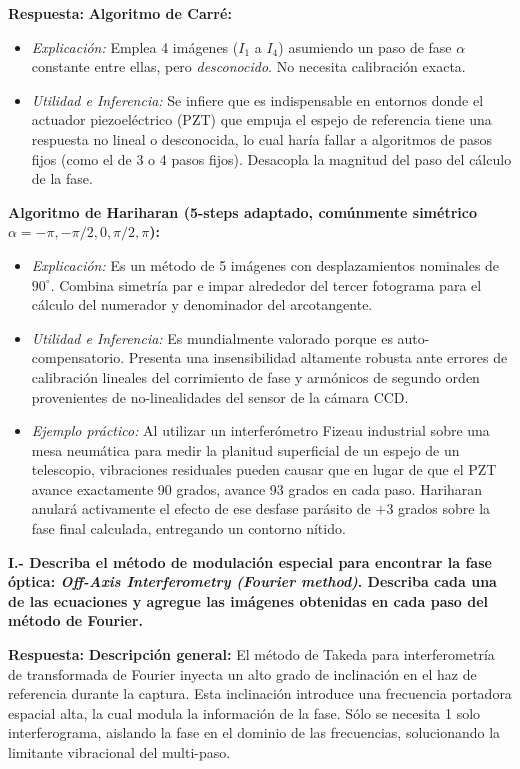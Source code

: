 \documentclass[12pt,letterpaper]{article}
\begin{document}
	\textbf{Respuesta:}
	\textbf{Algoritmo de Carré:}
	\begin{itemize}
		\item \textit{Explicación:} Emplea 4 imágenes ($I_1$ a $I_4$) asumiendo un paso de fase $\alpha$ constante entre ellas, pero \textit{desconocido}. No necesita calibración exacta.
		\item \textit{Utilidad e Inferencia:} Se infiere que es indispensable en entornos donde el actuador piezoeléctrico (PZT) que empuja el espejo de referencia tiene una respuesta no lineal o desconocida, lo cual haría fallar a algoritmos de pasos fijos (como el de 3 o 4 pasos fijos). Desacopla la magnitud del paso del cálculo de la fase.
	\end{itemize}
	
	\textbf{Algoritmo de Hariharan (5-steps adaptado, comúnmente simétrico $\alpha = -\pi, -\pi/2, 0, \pi/2, \pi$):}
	\begin{itemize}
		\item \textit{Explicación:} Es un método de 5 imágenes con desplazamientos nominales de $90^\circ$. Combina simetría par e impar alrededor del tercer fotograma para el cálculo del numerador y denominador del arcotangente.
		\item \textit{Utilidad e Inferencia:} Es mundialmente valorado porque es auto-compensatorio. Presenta una insensibilidad altamente robusta ante errores de calibración lineales del corrimiento de fase y armónicos de segundo orden provenientes de no-linealidades del sensor de la cámara CCD.
		\item \textit{Ejemplo práctico:} Al utilizar un interferómetro Fizeau industrial sobre una mesa neumática para medir la planitud superficial de un espejo de un telescopio, vibraciones residuales pueden causar que en lugar de que el PZT avance exactamente 90 grados, avance 93 grados en cada paso. Hariharan anulará activamente el efecto de ese desfase parásito de $+3$ grados sobre la fase final calculada, entregando un contorno nítido.
	\end{itemize}
	
	\vspace{0.8cm}
	\noindent \textbf{I.- Describa el método de modulación especial para encontrar la fase óptica: \textit{Off-Axis Interferometry (Fourier method)}. Describa cada una de las ecuaciones y agregue las imágenes obtenidas en cada paso del método de Fourier.}
	
	\textbf{Respuesta:}
	\textbf{Descripción general:} El método de Takeda para interferometría de transformada de Fourier inyecta un alto grado de inclinación en el haz de referencia durante la captura. Esta inclinación introduce una frecuencia portadora espacial alta, la cual modula la información de la fase. Sólo se necesita 1 solo interferograma, aislando la fase en el dominio de las frecuencias, solucionando la limitante vibracional del multi-paso.
	
\end{document}
